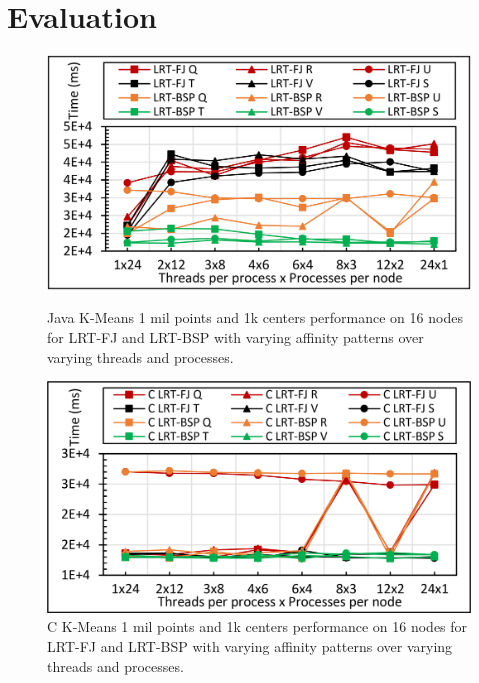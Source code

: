 \documentclass[10pt, conference, compsocconf]{IEEEtran}
\begin{document}



\section{Evaluation} \label{sec:evaluation}

\begin{figure}[!htb]
    \centering
    \begin{minipage}{.49\textwidth}
        \centering        
        \includegraphics[width=1\columnwidth]{images/fig_kmeans_1mil_1k_binding_patterns}
        \caption{Java K-Means 1 mil points and 1k centers performance on 16 nodes for \ac{LRT-FJ} and \ac{LRT-BSP} with varying affinity patterns over varying threads and processes.}
        \label{fig:fig_kmeans_1mil_1k_binding_patterns}
    \end{minipage}
    \hspace{1.4mm}
    \begin{minipage}{0.49\textwidth}
        \centering
        \includegraphics[width=1\columnwidth]{images/fig_C_kmeans_1mil_1k_binding_patterns}
        \caption{C K-Means 1 mil points and 1k centers performance on 16 nodes for \ac{LRT-FJ} and \ac{LRT-BSP} with varying affinity patterns over varying threads and processes.}
        \label{fig:fig_C_kmeans_1mil_1k_binding_patterns}
    \end{minipage}   
\end{figure}
\end{document}
